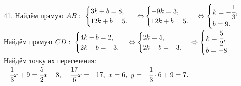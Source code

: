 41. Найдём прямую $AB:\ \begin{cases} 3k+b=8,\\ 12k+b=5.\end{cases}\Leftrightarrow\begin{cases} -9k=3,\\ 12k+b=5.\end{cases}\Leftrightarrow
\begin{cases} k=-\cfrac{1}{3},\\ b=9.\end{cases}$ Найдём прямую $CD:\ \begin{cases} 4k+b=2,\\ 2k+b=-3.\end{cases}\Leftrightarrow\begin{cases} 2k=5,\\ 2k+b=-3.\end{cases}\Leftrightarrow
\begin{cases} k=\cfrac{5}{2},\\ b=-8.\end{cases}$ Найдём точку их пересечения: $-\cfrac{1}{3}x+9=\cfrac{5}{2}x-8,\ -\cfrac{17}{6}x=-17,\ x=6,\ y=-\cfrac{1}{3}\cdot6+9=7.$\\
